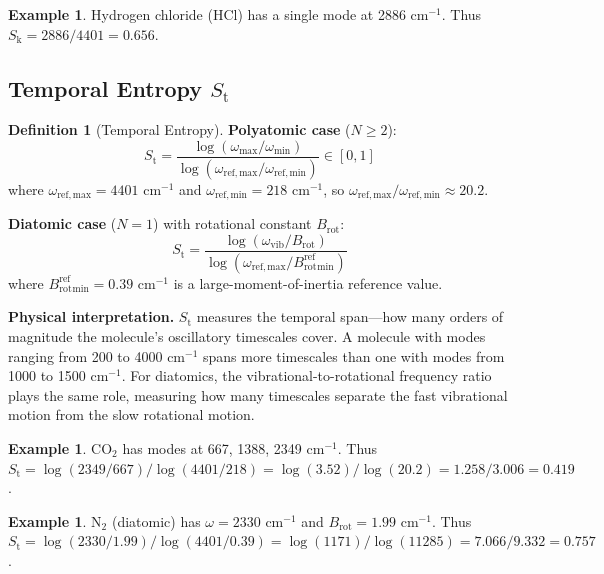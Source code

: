 \documentclass[11pt,a4paper]{article}
\theoremstyle{definition}
\newtheorem{definition}[theorem]{Definition}
\newtheorem{example}[theorem]{Example}
\theoremstyle{remark}
\newcommand{\Sk}{S_{\mathrm{k}}}
\newcommand{\St}{S_{\mathrm{t}}}
\newcommand{\Brot}{B_{\mathrm{rot}}}
\begin{document}
\begin{example}
Hydrogen chloride (HCl) has a single mode at 2886 cm$^{-1}$. Thus $\Sk = 2886/4401 = 0.656$.
\end{example}

\subsection{Temporal Entropy \texorpdfstring{$\St$}{S\_t}}

\begin{definition}[Temporal Entropy]
\label{def:s_t}
\textbf{Polyatomic case} ($N \geq 2$):
\begin{equation}
\St = \frac{\log(\omega_{\max}/\omega_{\min})}{\log(\omega_{\mathrm{ref,max}}/\omega_{\mathrm{ref,min}})} \in [0, 1]
\label{eq:s_t_poly}
\end{equation}
where $\omega_{\mathrm{ref,max}} = 4401$ cm$^{-1}$ and $\omega_{\mathrm{ref,min}} = 218$ cm$^{-1}$, so $\omega_{\mathrm{ref,max}}/\omega_{\mathrm{ref,min}} \approx 20.2$.

\textbf{Diatomic case} ($N = 1$) with rotational constant $\Brot$:
\begin{equation}
\St = \frac{\log(\omega_{\mathrm{vib}}/\Brot)}{\log(\omega_{\mathrm{ref,max}}/\Brot^{\mathrm{ref}}_{\mathrm{min}})}
\label{eq:s_t_diatomic}
\end{equation}
where $\Brot^{\mathrm{ref}}_{\mathrm{min}} = 0.39$ cm$^{-1}$ is a large-moment-of-inertia reference value.
\end{definition}

\textbf{Physical interpretation.} $\St$ measures the temporal span---how many orders of magnitude the molecule's oscillatory timescales cover. A molecule with modes ranging from 200 to 4000 cm$^{-1}$ spans more timescales than one with modes from 1000 to 1500 cm$^{-1}$. For diatomics, the vibrational-to-rotational frequency ratio plays the same role, measuring how many timescales separate the fast vibrational motion from the slow rotational motion.

\begin{example}
CO$_2$ has modes at 667, 1388, 2349 cm$^{-1}$. Thus $\St = \log(2349/667)/\log(4401/218) = \log(3.52)/\log(20.2) = 1.258/3.006 = 0.419$.
\end{example}

\begin{example}
N$_2$ (diatomic) has $\omega = 2330$ cm$^{-1}$ and $\Brot = 1.99$ cm$^{-1}$. Thus $\St = \log(2330/1.99)/\log(4401/0.39) = \log(1171)/\log(11285) = 7.066/9.332 = 0.757$.
\end{example}
\end{document}
